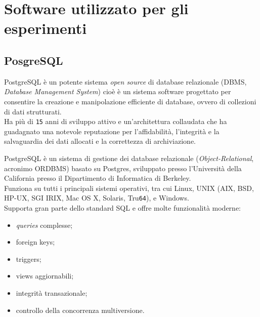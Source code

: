 \item
\section{Software utilizzato per gli esperimenti}
\item
\subsection{PosgreSQL}
PostgreSQL \`{e} un potente sistema \textit{open source} di database relazionale (DBMS, \textit{Database Management System}) cio\`{e} \`{e} un sistema software progettato per consentire la creazione e manipolazione efficiente di database, ovvero di collezioni di dati strutturati.\\ 
Ha pi\`{u} di \verb"15" anni di sviluppo attivo e un'architettura collaudata che ha guadagnato una notevole reputazione per l'affidabilit\`{a}, l'integrit\`{a} e la salvaguardia dei dati allocati e la correttezza di archiviazione.

PostgreSQL \`{e} un sistema di gestione dei database relazionale (\textit{Object-Relational}, acronimo ORDBMS) basato su Postgres, sviluppato presso l'Universit\`{a} della California presso il Dipartimento di Informatica di Berkeley.\cite{etichetta15}\\
Funziona su tutti i principali sistemi operativi, tra cui Linux, UNIX (AIX, BSD, HP-UX, SGI IRIX, Mac OS X, Solaris, Tru\verb"64"), e Windows.\cite{etichetta15}\\

Supporta gran parte dello standard SQL e offre molte funzionalit\`{a} moderne:
\begin{itemize}
\item 
\textit{queries} complesse;
\item
foreign keys;
\item
triggers;
\item
views aggiornabili;
\item
integrit\`{a} transazionale;
\item
controllo della concorrenza multiversione.
\end{itemize}


